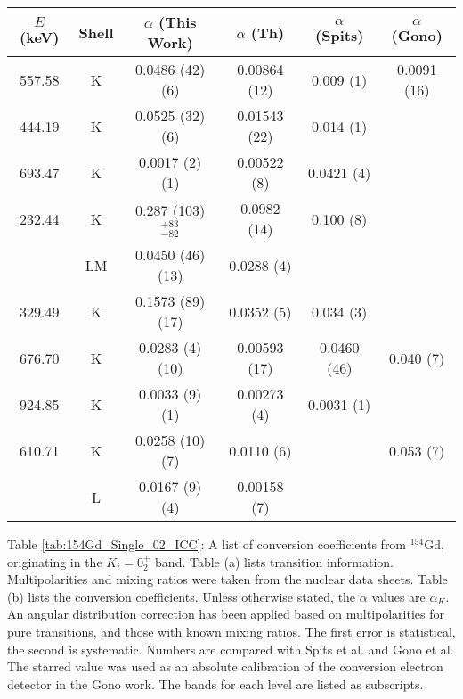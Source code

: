 \begin{table}
    \ContinuedFloat
    \begin{subtable}{\textwidth}
    \end{subtable}
    \begin{ThreePartTable}
    \begin{subtable}{\textwidth}
        \caption{}
        \begin{tabular}{c|c|c|c|c|c}
            \toprule
            $E$ (keV) & Shell &	$\alpha$ (This Work)	&	$\alpha$  (Th)\citep{kibedi08:_BRICC}	&	$\alpha$ (Spits)\citep{spits96:_154gd} & $\alpha$ (Gono)\citep{gono74:_154gd_e0}		\\
            \hline
            557.58	& K &	0.0486	(42) (6)	&	0.00864 (12)	&	0.009 (1) & 0.0091 (16)	\\
            \hline
            444.19	& K &	0.0525	(32) (6)	&	0.01543 (22)	&	0.014 (1)	\\
            \hline
            693.47	& K &	0.0017	(2) (1)	&	0.00522 (8)	&	0.0421 (4)	\\
            \hline
            232.44	& K &	0.287	(103) $^{+83}_{-82}$	&	0.0982 (14)	&	0.100 (8)	\\
            &	LM &		0.0450	(46) (13)	&	0.0288 (4)	&		\\
            \hline
            329.49	 & K &	0.1573	(89) (17)	&	0.0352 (5)	&	0.034 (3)	\\
            \hline
            676.70	& K &	0.0283	(4) (10)	&	0.00593 (17)	&	0.0460 (46) & 0.040 (7)	\\
            \hline
            924.85	& K &	0.0033	(9) (1)	&	0.00273 (4)	&	0.0031 (1)	\\
            \hline
            610.71	& K &	0.0258	(10) (7)	&	0.0110 (6)	& &	0.053 (7)	\\
            		& L &	0.0167	(9) (4)	&	0.00158 (7)	&		\\
            \bottomrule
        \end{tabular}
        \end{subtable}
        \begin{tablenotes}[para]
            Table \ref{tab:154Gd_Single_02_ICC}: A list of conversion coefficients from $^{154}$Gd, originating in the $K_i=0^+_2$ band. Table (a) lists transition information. Multipolarities and mixing ratios were taken from the nuclear data sheets\citep{reich09:_nds_154}. Table (b) lists the conversion coefficients. Unless otherwise stated, the $\alpha$ values are $\alpha_K$. An angular distribution correction has been applied based on multipolarities for pure transitions, and those with known mixing ratios. The first error is statistical, the second is systematic. Numbers are compared with Spits et al.\citep{spits96:_154gd} and Gono et al.\citep{gono74:_154gd_e0} The starred value was used as an absolute calibration of the conversion electron detector in the Gono work. The bands for each level are listed as subscripts.
        \end{tablenotes}
\end{ThreePartTable}
\end{table}
